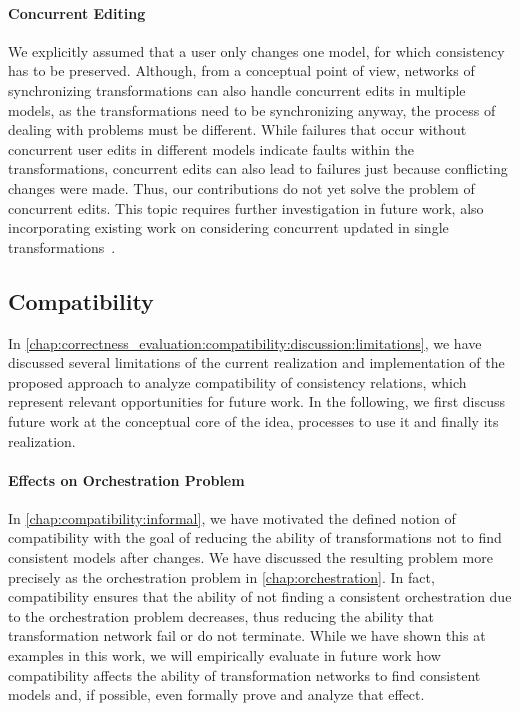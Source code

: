 \paragraph{Concurrent Editing}
\label{chap:futurework:correctness:concurrent}
We explicitly assumed that a user only changes one model, for which consistency has to be preserved.
Although, from a conceptual point of view, networks of synchronizing transformations can also handle concurrent edits in multiple models, as the transformations need to be synchronizing anyway, the process of dealing with problems must be different.
While failures that occur without concurrent user edits in different models indicate faults within the transformations, concurrent edits can also lead to failures just because conflicting changes were made.
Thus, our contributions do not yet solve the problem of concurrent edits.
This topic requires further investigation in future work, also incorporating existing work on considering concurrent updated in single transformations~\cite{xiong2013SynchronizingConcurrentUpdates-SoSym,xiong2009parallelUpdates-ICMT}.


\subsection{Compatibility}

In \autoref{chap:correctness_evaluation:compatibility:discussion:limitations}, we have discussed several limitations of the current realization and implementation of the proposed approach to analyze compatibility of consistency relations, which represent relevant opportunities for future work.
In the following, we first discuss future work at the conceptual core of the idea, processes to use it and finally its realization.

\paragraph{Effects on Orchestration Problem}
\label{chap:futurework:correctness:compatibility:orchestration}
In \autoref{chap:compatibility:informal}, we have motivated the defined notion of compatibility with the goal of reducing the ability of transformations not to find consistent models after changes.
We have discussed the resulting problem more precisely as the orchestration problem in \autoref{chap:orchestration}.
In fact, compatibility ensures that the ability of not finding a consistent orchestration due to the orchestration problem decreases, thus reducing the ability that transformation network fail or do not terminate.
While we have shown this at examples in this work, we will empirically evaluate in future work how compatibility affects the ability of transformation networks to find consistent models and, if possible, even formally prove and analyze that effect. 

